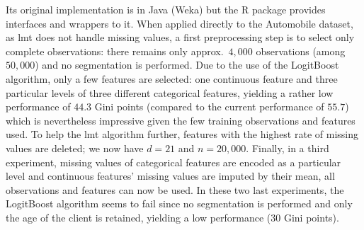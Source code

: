 Its original implementation is in Java (Weka) but the \textsf{R} package  provides interfaces and wrappers to it. When applied directly to the Automobile dataset, as \gls{lmt} does not handle missing values, a first preprocessing step is to select only complete observations: there remains only approx.\ $4{,}000$ observations (among $50{,}000$) and no segmentation is performed. Due to the use of the LogitBoost algorithm, only a few features are selected: one continuous feature and three particular levels of three different categorical features, yielding a rather low performance of $44.3$ Gini points (compared to the current performance of $55.7$) which is nevertheless impressive given the few training observations and features used. To help the \gls{lmt} algorithm further, features with the highest rate of missing values are deleted; we now have $d = 21$ and $n = 20{,}000$. Finally, in a third experiment, missing values of categorical features are encoded as a particular level and continuous features' missing values are imputed by their mean, all observations and features can now be used. In these two last experiments, the LogitBoost algorithm seems to fail since no segmentation is performed and only the age of the client is retained, yielding a low performance ($30$ Gini points).

